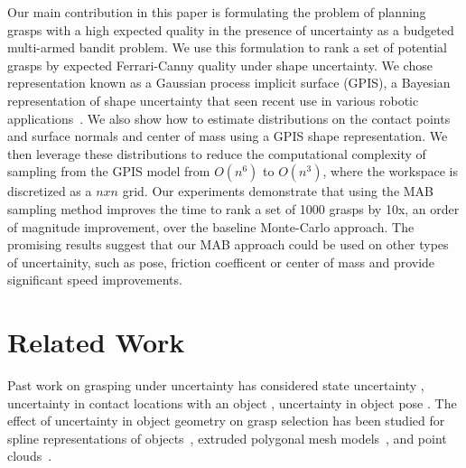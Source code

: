 \documentclass[letterpaper, 10 pt, conference]{ieeeconf}  %
\begin{document}
Our main contribution in this paper is formulating the problem of planning grasps with a high expected quality in the presence of uncertainty as a budgeted multi-armed bandit problem.
We use this formulation to rank a set of potential grasps by expected Ferrari-Canny quality \cite{ferrari1992} under shape uncertainty.  We chose representation known as a Gaussian process implicit surface (GPIS), a Bayesian representation of shape uncertainty that seen recent use in various robotic applications~\cite{dragiev2011, hollinger2013}.
We also show how to estimate distributions on the contact points and surface normals and center of mass using a GPIS shape representation. We then leverage these distributions to reduce the computational complexity of sampling from the GPIS model from $O(n^6)$ to $O(n^3)$, where the workspace is discretized as a $nxn$ grid. Our experiments demonstrate that using the MAB sampling method improves the time to rank a set of 1000 grasps by 10x, an order of magnitude improvement, over the baseline Monte-Carlo approach. The promising results suggest that our MAB approach could be used on other types of uncertainity, such as pose, friction coefficent or center of mass and provide significant speed improvements. 

\section{Related Work}

Past work on grasping under uncertainty has considered state uncertainty \cite{goldberg1990bayesian, stulp2011learning}, uncertainty in contact locations with an object \cite{zheng2005}, uncertainty in object pose \cite{christopoulos2007handling, weisz2012pose, kim2012physically}.
The effect of uncertainty in object geometry on grasp selection has been studied for spline representations of objects~\cite{christopoulos2007handling}, extruded polygonal mesh models~\cite{kehoe2012estimating, kehoe2012toward}, and point clouds~\cite{hsiao2011bayesian}.
\end{document}
